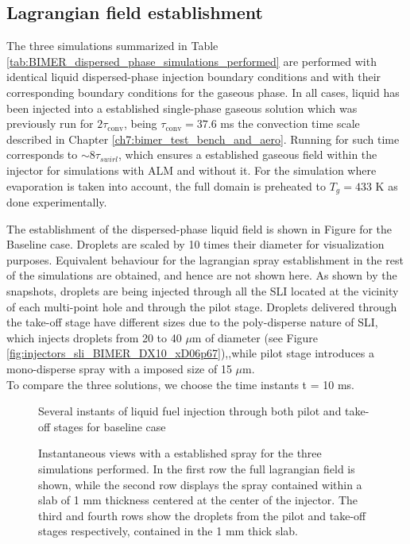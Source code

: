 \subsection{Lagrangian field establishment}

The three simulations summarized in Table \ref{tab:BIMER_dispersed_phase_simulations_performed} are performed with identical liquid dispersed-phase injection boundary conditions and with their corresponding boundary conditions for the gaseous phase. In all cases, liquid has been injected into a established single-phase gaseous solution which was previously run for $2 \tau_\mathrm{conv}$, being $\tau_\mathrm{conv} = 37.6$ ms the convection time scale described in Chapter \ref{ch7:bimer_test_bench_and_aero}. Running for such time corresponds to $\sim 8 \tau_{swirl}$, which ensures a established gaseous field within the injector for simulations with ALM and without it. For the simulation where evaporation is taken into account, the full domain is preheated to $T_g = 433$ K as done experimentally.

The establishment of the dispersed-phase liquid field is shown in Figure for the Baseline case. Droplets are scaled by 10 times their diameter for visualization purposes. Equivalent behaviour for the lagrangian spray establishment in the rest of the simulations are obtained, and hence are not shown here. As shown by the snapshots, droplets are being injected through all the SLI located at the vicinity of each multi-point hole and through the pilot stage. Droplets delivered through the take-off stage have different sizes due to the poly-disperse nature of SLI, which injects droplets from 20 to 40 $\mu$m of diameter (see Figure \ref{fig:injectors_sli_BIMER_DX10_xD06p67}),,while pilot stage introduces a mono-disperse spray with a imposed size of 15 $\mu$m. \\

To compare the three solutions, we choose the time instants t = 10 ms.

\clearpage

\begin{figure}[h!]
	\centering	{}
	\caption{Several instants of liquid fuel injection through both pilot and take-off stages for baseline case}	\label{fig:BIMER_LGS_spray_establishment}
\end{figure}


\clearpage

\begin{figure}[h!]
	\centering	{}
	\caption[Instantaneous views with a established spray for the three simulations performed]{Instantaneous views with a established spray for the three simulations performed. In the first row the full lagrangian field is shown, while the second row displays the spray contained within a slab of 1 mm thickness centered at the center of the injector. The third and fourth rows show the droplets from the pilot and take-off stages respectively, contained in the 1 mm thick slab.}	\label{fig:BIMER_LGS_spray_establishment}
\end{figure}

